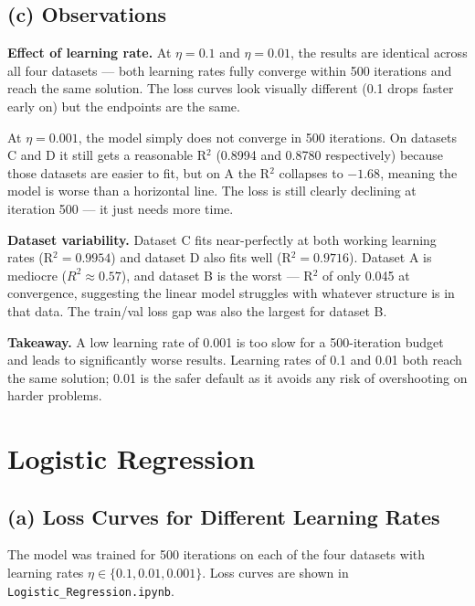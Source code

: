 \documentclass[11pt,a4paper]{article}
\begin{document}
\subsection{(c) Observations}

\textbf{Effect of learning rate.}
At $\eta = 0.1$ and $\eta = 0.01$, the results are identical across all four datasets --- both learning rates fully converge within 500 iterations and reach the same solution. The loss curves look visually different (0.1 drops faster early on) but the endpoints are the same.

At $\eta = 0.001$, the model simply does not converge in 500 iterations. On datasets C and D it still gets a reasonable R$^2$ (0.8994 and 0.8780 respectively) because those datasets are easier to fit, but on A the R$^2$ collapses to $-1.68$, meaning the model is worse than a horizontal line. The loss is still clearly declining at iteration 500 --- it just needs more time.

\textbf{Dataset variability.}
Dataset C fits near-perfectly at both working learning rates (R$^2 = 0.9954$) and dataset D also fits well (R$^2 = 0.9716$). Dataset A is mediocre ($R^2 \approx 0.57$), and dataset B is the worst --- R$^2$ of only 0.045 at convergence, suggesting the linear model struggles with whatever structure is in that data. The train/val loss gap was also the largest for dataset B.

\textbf{Takeaway.}
A low learning rate of 0.001 is too slow for a 500-iteration budget and leads to significantly worse results. Learning rates of 0.1 and 0.01 both reach the same solution; 0.01 is the safer default as it avoids any risk of overshooting on harder problems.

\section{Logistic Regression}

\subsection{(a) Loss Curves for Different Learning Rates}

The model was trained for 500 iterations on each of the four datasets with learning rates $\eta \in \{0.1, 0.01, 0.001\}$. Loss curves are shown in \texttt{Logistic\_Regression.ipynb}.
\end{document}
